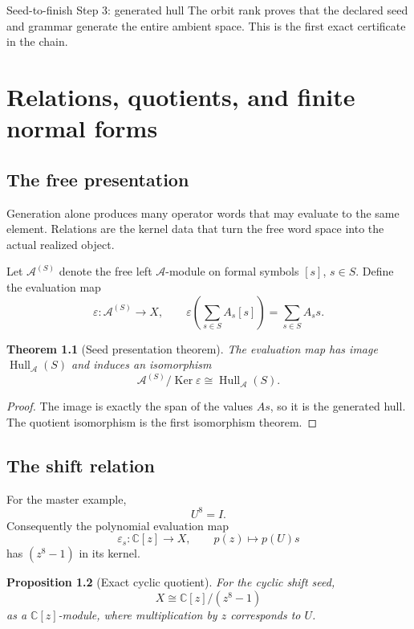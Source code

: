 \documentclass[11pt,oneside]{book}
\newtheorem{theorem}{Theorem}[chapter]
\newtheorem{proposition}[theorem]{Proposition}
\theoremstyle{definition}
\theoremstyle{remark}
\DeclareMathOperator{\Ker}{Ker}
\newcommand{\C}{\mathbb C}
\DeclareMathOperator{\Hull}{Hull}
\begin{document}
\begin{stepbox}{Seed-to-finish Step 3: generated hull}
The orbit rank proves that the declared seed and grammar generate the entire ambient space.  This is the first exact certificate in the chain.
\end{stepbox}

\chapter{Relations, quotients, and finite normal forms}\label{ch:relations}

\section{The free presentation}
Generation alone produces many operator words that may evaluate to the same element.  Relations are the kernel data that turn the free word space into the actual realized object.

Let $\mathcal A^{(S)}$ denote the free left $\mathcal A$-module on formal symbols $[s]$, $s\in S$.  Define the evaluation map
\[
\varepsilon:\mathcal A^{(S)}\longrightarrow X,
\qquad
\varepsilon\!\left(\sum_{s\in S}A_s[s]\right)
=
\sum_{s\in S}A_ss.
\]

\begin{theorem}[Seed presentation theorem]\label{thm:seed-presentation}
The evaluation map has image $\Hull_{\mathcal A}(S)$ and induces an isomorphism
\[
\boxed{
\mathcal A^{(S)}/\Ker\varepsilon
\cong
\Hull_{\mathcal A}(S).
}
\]
\end{theorem}

\begin{proof}
The image is exactly the span of the values $As$, so it is the generated hull.  The quotient isomorphism is the first isomorphism theorem.
\end{proof}

\section{The shift relation}
For the master example,
\[
U^8=I.
\]
Consequently the polynomial evaluation map
\[
\varepsilon_s:\C[z]\longrightarrow X,
\qquad
p(z)\longmapsto p(U)s
\]
has $(z^8-1)$ in its kernel.

\begin{proposition}[Exact cyclic quotient]\label{prop:cyclic-quotient}
For the cyclic shift seed,
\[
\boxed{
X\cong \C[z]/(z^8-1)
}
\]
as a $\C[z]$-module, where multiplication by $z$ corresponds to $U$.
\end{proposition}
\end{document}
